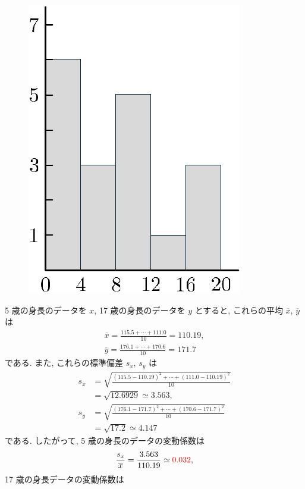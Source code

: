 \begin{qenumerate}
{\begin{enumerate}
{\begin{figure}[H]
					\includegraphics[scale = 0.5]{./figure/87.pdf}
				\end{figure}
			}
		\end{enumerate}
	}
	\item{
		5 歳の身長のデータを $x$, 17 歳の身長のデータを $y$ とすると, これらの平均 $\overline{x}$, $\overline{y}$ は
		\begin{gather}
			\overline{x} = \frac{115.5 + \cdots + 111.0}{10} = 110.19, \\
			\overline{y} = \frac{176.1 + \cdots + 170.6}{10} = 171.7
		\end{gather}
		である.
		また, これらの標準偏差 $s_{x}$, $s_{y}$ は
		\begin{align}
			s_{x} &= \sqrt{\frac{(115.5 - 110.19)^{2} + \cdots + (111.0 - 110.19)^{2}}{10}} \\
				&= \sqrt{12.6929} \simeq 3.563, \\
			s_{y} &= \sqrt{\frac{(176.1 - 171.7)^{2} + \cdots + (170.6 - 171.7)^{2}}{10}} \\
				&= \sqrt{17.2} \simeq 4.147
		\end{align}
		である.
		したがって, 5 歳の身長のデータの変動係数は
		\begin{align}
			\frac{s_{x}}{\overline{x}} = \frac{3.563}{110.19} \simeq \textcolor{red}{0.032}, 
		\end{align}
		17 歳の身長データの変動係数は
		\begin{align}

\end{align}}
\end{qenumerate}
